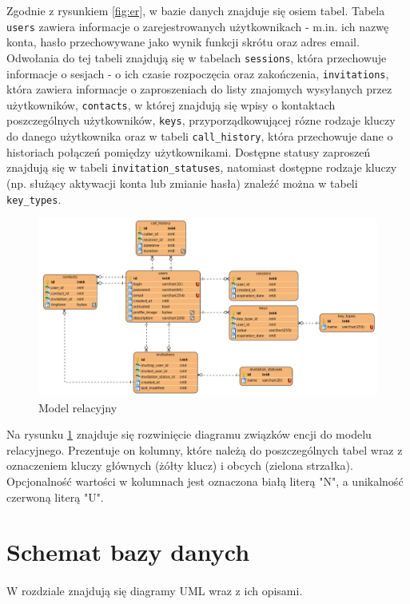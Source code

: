 \documentclass{article}
\begin{document}
    Zgodnie z rysunkiem \ref{fig:er}, w bazie danych znajduje się osiem tabel. Tabela \texttt{users} zawiera informacje o zarejestrowanych użytkownikach - m.in. ich nazwę konta, hasło przechowywane jako wynik funkcji skrótu oraz adres email. Odwołania do tej tabeli znajdują się w tabelach \texttt{sessions}, która przechowuje informacje o sesjach - o ich czasie rozpoczęcia oraz zakończenia, \texttt{invitations}, która zawiera informacje o zaproszeniach do listy znajomych wysyłanych przez użytkowników, \texttt{contacts}, w której znajdują się wpisy o kontaktach poszczególnych użytkowników, \texttt{keys}, przyporządkowującej rózne rodzaje kluczy do danego użytkownika oraz w tabeli \texttt{call\_history}, która przechowuje dane o historiach połączeń pomiędzy użytkownikami. Dostępne statusy zaproszeń znajdują się w tabeli \texttt{invitation\_statuses}, natomiast dostępne rodzaje kluczy (np. służący aktywacji konta lub zmianie hasła) znaleźć można w tabeli \texttt{key\_types}.

    \begin{figure}[H]
      \centering
        \includegraphics[width=1.0\linewidth]{assets/rel.png}
        \caption[]{Model relacyjny}
        \label{fig:rel}
    \end{figure}

    Na rysunku \ref{fig:rel} znajduje się rozwinięcie diagramu związków encji do modelu relacyjnego. Prezentuje on kolumny, które należą do poszczególnych tabel wraz z oznaczeniem kluczy głównych (żółty klucz) i obcych (zielona strzałka). Opcjonalność wartości w kolumnach jest oznaczona białą literą "N", a unikalność czerwoną literą "U".

    \section{Schemat bazy danych}
    \paragraph{} W rozdziale znajdują się diagramy UML wraz z ich opisami.
\end{document}
